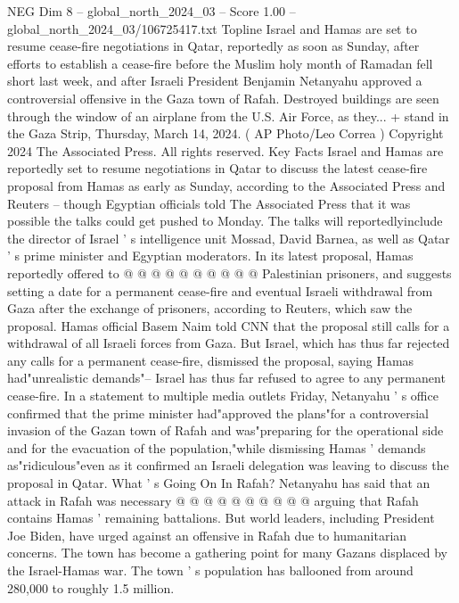 \begin{textsample}{NEG Dim 8 – global\_north\_2024\_03 – Score 1.00 – global\_north\_2024\_03/106725417.txt}  \label{ex:f8_neg_448}
Topline Israel and Hamas are set to resume cease-fire negotiations in Qatar, reportedly as soon as Sunday, after efforts to establish a cease-fire before the Muslim holy month of Ramadan fell short last week, and after Israeli President Benjamin Netanyahu approved a controversial offensive in the Gaza town of Rafah.
Destroyed buildings are seen through the window of an airplane from the U.S.
Air Force, as they... + stand in the Gaza Strip, Thursday, March 14, 2024. ( AP Photo/Leo Correa ) Copyright 2024 The Associated Press.
All rights reserved.
Key Facts Israel and Hamas are reportedly set to resume negotiations in Qatar to discuss the latest cease-fire proposal from Hamas as early as Sunday, according to the Associated Press and Reuters -- though Egyptian officials told The Associated Press that it was possible the talks could get pushed to Monday.
The talks will reportedlyinclude the director of Israel ' s intelligence unit Mossad, David Barnea, as well as Qatar ' s prime minister and Egyptian moderators.
In its latest proposal, Hamas reportedly offered to @ @ @ @ @ @ @ @ @ @ Palestinian prisoners, and suggests setting a date for a permanent cease-fire and eventual Israeli withdrawal from Gaza after the exchange of prisoners, according to Reuters, which saw the proposal.
Hamas official Basem Naim told CNN that the proposal still calls for a withdrawal of all Israeli forces from Gaza.
But Israel, which has thus far rejected any calls for a permanent cease-fire, dismissed the proposal, saying Hamas had"unrealistic demands"-- Israel has thus far refused to agree to any permanent cease-fire.
In a statement to multiple media outlets Friday, Netanyahu ' s office confirmed that the prime minister had"approved the plans"for a controversial invasion of the Gazan town of Rafah and was"preparing for the operational side and for the evacuation of the population,"while dismissing Hamas ' demands as"ridiculous"even as it confirmed an Israeli delegation was leaving to discuss the proposal in Qatar.
What ' s Going On In Rafah?
Netanyahu has said that an attack in Rafah was necessary @ @ @ @ @ @ @ @ @ @ arguing that Rafah contains Hamas ' remaining battalions.
But world leaders, including President Joe Biden, have urged against an offensive in Rafah due to humanitarian concerns.
The town has become a gathering point for many Gazans displaced by the Israel-Hamas war.
The town ' s population has ballooned from around 280,000 to roughly 1.5 million.

\end{textsample}
